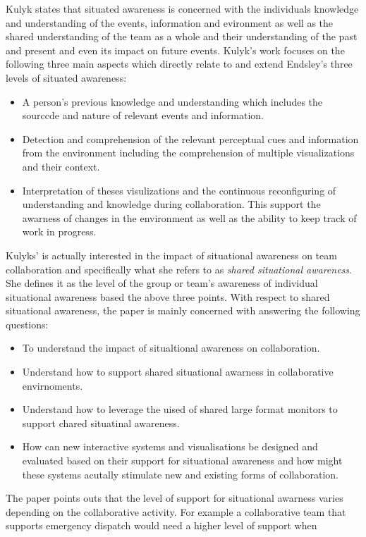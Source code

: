 \documentclass{sig-alternate}
\begin{document}
Kulyk states that situated awareness is concerned with the individuals
knowledge and understanding of the events, information and evironment as well as
the shared understanding of the team as a whole and their understanding of the
past and present and even its impact on future events. Kulyk's work focuses on
the following three main aspects which directly relate to and extend Endsley's
three levels of situated awareness:
\begin{itemize}
\item A person's previous knowledge and understanding which includes the
sourccde and nature of relevant events and information.
\item Detection and comprehension of the relevant perceptual cues and
information from the environment including the comprehension of multiple
visualizations and their context.
\item Interpretation of theses visulizations and the continuous reconfiguring of
understanding and knowledge during collaboration. This support the
awarness of changes in the environment as well as the ability to
keep track of work in progress.\end{itemize} 
Kulyks' is actually interested in the impact of situational awareness on team
collaboration and specifically what she refers to as \emph{shared situational
awareness}. She defines it as the level of the group or team's awareness of
individual situational awareness based the above three points. With respect to
shared situational awareness, the paper is mainly concerned with answering the
following questions:
\begin{itemize}
\item To understand the impact of situaltional awareness on
collaboration.
\item Understand how to support shared situational awarness in collaborative
envirnoments.
\item Understand how to leverage the uised of shared large format monitors to 
support chared situatinal awareness.
\item How can new interactive systems and visualisations be designed and
evaluated based on their support for situational awareness and how might these
systems acutally stimulate new and existing forms of collaboration.
\end{itemize}
The paper points outs that the level of support for situational awarness
varies depending on the collaborative activity. For example a collaborative team
that supports emergency dispatch would need a higher level of support when
\end{document}
